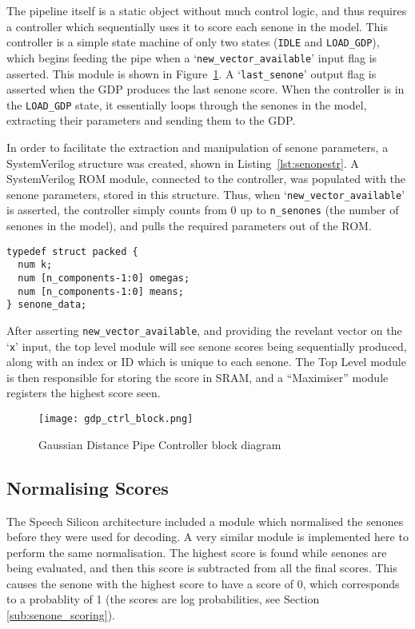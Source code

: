 		The pipeline itself is a static object without much control logic, and thus requires a controller which sequentially uses it to score each senone in the model.  This controller is a simple state machine of only two states (\texttt{IDLE} and \texttt{LOAD\_GDP}), which begins feeding the pipe when a `\texttt{new\_vector\_available}' input flag is asserted.  This module is shown in Figure~\ref{fig:gdp_ctrl_block}.  A `\texttt{last\_senone}' output flag is asserted when the GDP produces the last senone score.  When the controller is in the \texttt{LOAD\_GDP} state, it essentially loops through the senones in the model, extracting their parameters and sending them to the GDP.  

		In order to facilitate the extraction and manipulation of senone parameters, a SystemVerilog structure was created, shown in Listing~\ref{lst:senonestr}. A SystemVerilog ROM module, connected to the controller, was populated with the senone parameters, stored in this structure.  Thus, when `\texttt{new\_vector\_available}' is asserted, the controller simply counts from 0 up to \texttt{n\_senones} (the number of senones in the model), and pulls the required parameters out of the ROM.

\begin{lstlisting}[style=customc, label=lst:senonestr, caption=Senone parameter data structure]
typedef struct packed {
  num k;
  num [n_components-1:0] omegas;
  num [n_components-1:0] means;
} senone_data;
\end{lstlisting}

		After asserting \texttt{new\_vector\_available}, and providing the revelant vector on the `\texttt{x}' input, the top level module will see  senone scores being sequentially produced, along with an index or ID which is unique to each senone.  The Top Level module is then responsible for storing the score in SRAM, and a ``Maximiser'' module registers the highest score seen.
		\begin{figure}[tb]
			\begin{center}
				\texttt{[image: gdp\_ctrl\_block.png]}
			\end{center}
			\caption{Gaussian Distance Pipe Controller block diagram}
			\label{fig:gdp_ctrl_block}
		\end{figure}

	\subsection{Normalising Scores} %
	\label{sub:normaliser}
		The Speech Silicon architecture included a module which normalised the senones before they were used for decoding.  A very similar module is implemented here to perform the same normalisation.  The highest score is found while senones are being evaluated, and then this score is subtracted from all the final scores.  This causes the senone with the highest score to have a score of 0, which corresponds to a probablity of 1 (the scores are log probabilities, see Section \ref{sub:senone_scoring}).

